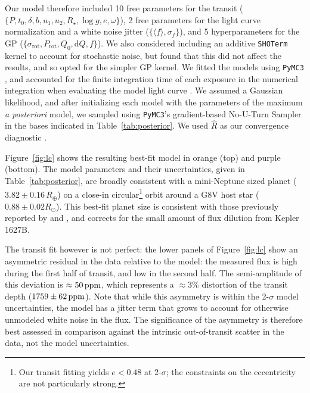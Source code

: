 \documentclass[12pt,modern,twocolumn,tighten]{aastex63}
\begin{document}
Our model therefore included 10 free parameters for the transit ($\{P,
t_0, \delta, b, u_1 ,u_2 ,R_\star, \log g, e, \omega \}$), 2 free
parameters for the light curve normalization and a white noise jitter
($\{\langle f \rangle, \sigma_f \}$), and 5 hyperparameters for the GP
($\{\sigma_{\mathrm{rot}}, P_{\mathrm{rot}}, Q_0, \mathrm{d}Q, f \}$).
We also considered including an additive \texttt{SHOTerm} kernel to
account for stochastic noise, but found that this did not affect the
results, and so opted for the simpler GP kernel.  We fitted the models
using \texttt{PyMC3} \citep{salvatier_2016_PyMC3,exoplanet:theano},
and accounted for the finite integration time of each exposure in the
numerical integration when evaluating the model light curve
\citep[see][]{kipping_binning_2010}.  We assumed a Gaussian
likelihood, and after initializing each model with the parameters of
the maximum {\it a posteriori} model, we sampled using
\texttt{PyMC3}'s gradient-based No-U-Turn Sampler
\citep{hoffman_no-u-turn_2014} in the bases indicated in
Table~\ref{tab:posterior}.  We used $\hat{R}$ as our convergence
diagnostic \citep{gelman_inference_1992}.

Figure~\ref{fig:lc} shows the resulting best-fit model in orange (top)
and purple (bottom).  The model parameters and their uncertainties,
given in Table~\ref{tab:posterior}, are broadly consistent with a
mini-Neptune sized planet ($3.82\pm0.16\,R_\oplus$) on a close-in
circular\footnote{ Our transit fitting yields $e<0.48$ at 2-$\sigma$;
the constraints on the eccentricity are not particularly strong.}
orbit around a G8V host star ($0.88 \pm 0.02 R_\odot$).  This best-fit
planet size is consistent with those previously reported by
\citet{morton_false_2016} and \citet{berger_identifying_2018}, and
corrects for the small amount of flux dilution from Kepler\,1627B.

The transit fit however is not perfect: the lower panels of
Figure~\ref{fig:lc} show an asymmetric residual in the data relative
to the model: the measured flux is high during the first half of
transit, and low in the second half.  The semi-amplitude of this
deviation is $\approx50\,{\rm ppm}$, which represents a $\approx 3\%$
distortion of the transit depth ($1759\pm62\,{\rm ppm}$).  Note that
while this asymmetry is within the 2-$\sigma$ model uncertainties, the
model has a jitter term that grows to account for otherwise unmodeled
white noise in the flux.  The significance of the asymmetry is
therefore best assessed in comparison against the intrinsic
out-of-transit scatter in the data, not the model uncertainties.
\end{document}
